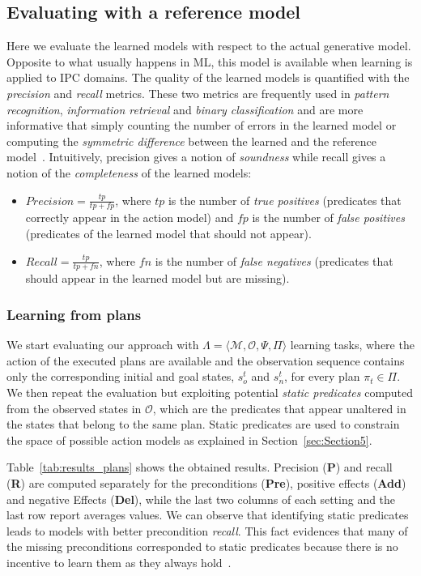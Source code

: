 \documentclass[3p,times]{elsarticle}
\newcommand{\tup}[1]{{\langle #1 \rangle}}
\begin{document}
\subsection{Evaluating with a reference model}
Here we evaluate the learned models with respect to the actual generative model. Opposite to what usually happens in ML, this model is available when learning is applied to IPC domains. The quality of the learned models is quantified with the {\em precision} and {\em recall} metrics. These two metrics are frequently used in {\em pattern recognition}, {\em information retrieval} and {\em binary classification} and are more informative that simply counting the number of errors in the learned model or computing the {\em symmetric difference} between the learned and the reference model~\cite{davis2006relationship}. Intuitively, precision gives a notion of {\em soundness} while recall gives a notion of the {\em completeness} of the learned models:
\begin{itemize}
\item $Precision=\frac{tp}{tp+fp}$, where $tp$ is the number of {\em true positives} (predicates that correctly appear in the action model) and $fp$ is the number of {\em false positives} (predicates of the learned model that should not appear). 
\item $Recall=\frac{tp}{tp+fn}$, where $fn$ is the number of {\em false negatives} (predicates that should appear in the learned model but are missing). 
\end{itemize}


\subsubsection{Learning from plans}
We start evaluating our approach with $\Lambda=\tup{\mathcal{M},\mathcal{O},\Psi,\Pi}$ learning tasks, where the action of the executed plans are available and the observation sequence contains only the corresponding initial and goal states, $s_o^t$ and $s_n^t$, for every plan $\pi_t\in\Pi$. We then repeat the evaluation but exploiting potential \emph{static predicates} computed from the observed states in $\mathcal{O}$, which are the predicates that appear unaltered in the states that belong to the same plan. Static predicates are used to constrain the space of possible action models as explained in Section~\ref{sec:Section5}.

Table~\ref{tab:results_plans} shows the obtained results. Precision ({\bf P}) and recall ({\bf R}) are computed separately for the preconditions ({\bf Pre}), positive effects ({\bf Add}) and negative Effects ({\bf Del}), while the last two columns of each setting and the last row report averages values. We can observe that identifying static predicates leads to models with better precondition {\em recall}. This fact evidences that many of the missing preconditions corresponded to static predicates because there is no incentive to learn them as they always hold~\cite{gregory2015domain}.
\end{document}
